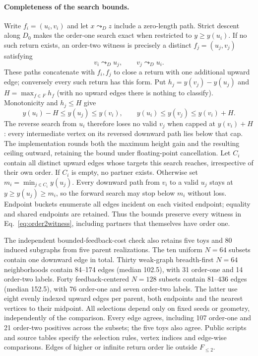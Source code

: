 \documentclass[11pt]{article}
\begin{document}
\paragraph*{Completeness of the search bounds.}
Write $f_i=(u_i,v_i)$ and let $x\leadsto_D z$ include a zero-length path. Strict descent along $D_0$ makes the order-one search exact when restricted to $y\geq y(u_i)$. If no such return exists, an order-two witness is precisely a distinct $f_j=(u_j,v_j)$ satisfying
\begin{equation}
v_i\leadsto_D u_j,\qquad v_j\leadsto_D u_i.
\label{eq:order2witness}
\end{equation}
These paths concatenate with $f_i,f_j$ to close a return with one additional upward edge; conversely every such return has this form. Put $h_j=y(v_j)-y(u_j)$ and $H=\max_{f\in F}h_f$ (with no upward edges there is nothing to classify). Monotonicity and $h_j\leq H$ give
\begin{equation}
y(u_i)-H\leq y(u_j)\leq y(v_i),\qquad
y(u_i)\leq y(v_j)\leq y(v_i)+H.
\label{eq:searchbounds}
\end{equation}
The reverse search from $u_i$ therefore loses no valid $v_j$ when capped at $y(v_i)+H$: every intermediate vertex on its reversed downward path lies below that cap. The implementation rounds both the maximum height gain and the resulting ceiling outward, retaining the bound under floating-point cancellation. Let $C_i$ contain all distinct upward edges whose targets this search reaches, irrespective of their own order. If $C_i$ is empty, no partner exists. Otherwise set $m_i=\min_{j\in C_i}y(u_j)$. Every downward path from $v_i$ to a valid $u_j$ stays at $y\geq y(u_j)\geq m_i$, so the forward search may stop below $m_i$ without loss. Endpoint buckets enumerate all edges incident on each visited endpoint; equality and shared endpoints are retained. Thus the bounds preserve every witness in Eq.~\eqref{eq:order2witness}, including partners that themselves have order one.

The independent bounded-feedback-cost check also retains five toys and 80 induced subgraphs from five parent realizations. The ten uniform $N=64$ subsets contain one downward edge in total. Thirty weak-graph breadth-first $N=64$ neighborhoods contain 84--174 edges (median 102.5), with 31 order-one and 14 order-two labels. Forty feedback-centered $N=128$ subsets contain 81--436 edges (median 152.5), with 76 order-one and seven order-two labels. The latter use eight evenly indexed upward edges per parent, both endpoints and the nearest vertices to their midpoint. All selections depend only on fixed seeds or geometry, independently of the comparison. Every edge agrees, including 107 order-one and 21 order-two positives across the subsets; the five toys also agree. Public scripts and source tables specify the selection rules, vertex indices and edge-wise comparisons. Edges of higher or infinite return order lie outside $F_{\leq2}$.
\end{document}
